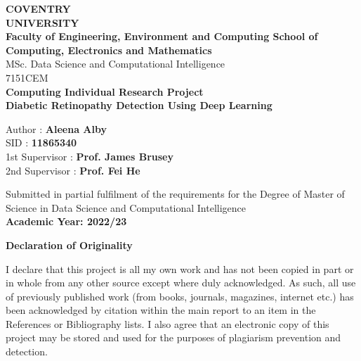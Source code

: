 \documentclass[
]{article}
\author{}
\date{\vspace{-2.5em}}
\begin{document}
\begin{center}
\huge{\textbf{COVENTRY}}\\
\huge{\textbf{UNIVERSITY}}\\
\vspace*{1\baselineskip}
\Large{\textbf{Faculty of Engineering, Environment and Computing
School of Computing, Electronics and Mathematics}}\\

\vspace*{3\baselineskip}
\Large{MSc. Data Science and Computational Intelligence}\\
\normalsize{7151CEM}\\
\normalsize{\textbf{Computing Individual Research Project}}\\
\vspace*{6\baselineskip}
\LARGE{\textbf{Diabetic Retinopathy Detection Using Deep Learning}}\\
\vspace*{3\baselineskip}

\begin{left}
\Large{Author :{\textbf { Aleena Alby}}}\\
\Large{SID :{\textbf { 11865340}}}\\
\Large{1st Supervisor :{\textbf { Prof. James Brusey}}}\\
\Large{2nd Supervisor :{\textbf { Prof. Fei He}}}\\
\vspace*{1\baselineskip}
\end{left}
\vspace*{8\baselineskip}
\normalsize{Submitted in partial fulfilment of the requirements for the Degree of Master of Science in Data Science and Computational Intelligence}\\
\Large{\textbf{Academic Year: 2022/23}}\\
\end{center}



\newpage

\newpage

\textbf{Declaration of Originality}

I declare that this project is all my own work and has not been copied
in part or in whole from any other source except where duly
acknowledged. As such, all use of previously published work (from books,
journals, magazines, internet etc.) has been acknowledged by citation
within the main report to an item in the References or Bibliography
lists. I also agree that an electronic copy of this project may be
stored and used for the purposes of plagiarism prevention and detection.
\end{document}
